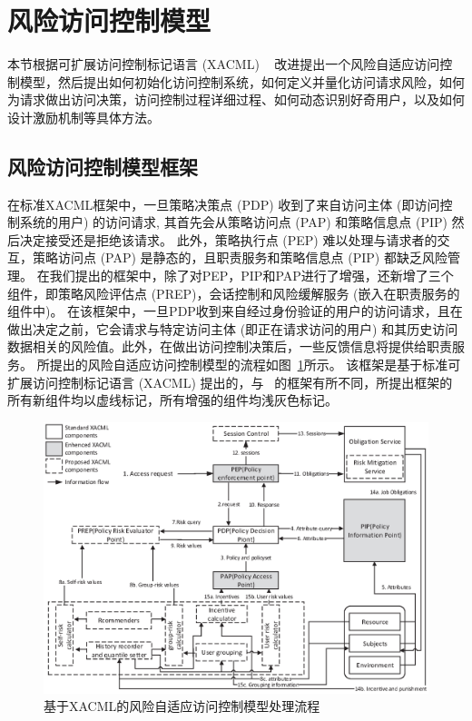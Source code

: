 \section{风险访问控制模型}
\label{sec:proposed model}
本节根据可扩展访问控制标记语言 (XACML) ~\cite{verma2004xml} 改进提出一个风险自适应访问控制模型，然后提出如何初始化访问控制系统，如何定义并量化访问请求风险，如何为请求做出访问决策，访问控制过程详细过程、如何动态识别好奇用户，以及如何设计激励机制等具体方法。

\subsection{风险访问控制模型框架}
\label{subsec:framework}

在标准XACML框架中，一旦策略决策点 (PDP) 收到了来自访问主体 (即访问控制系统的用户) 的访问请求, 其首先会从策略访问点 (PAP) 和策略信息点 (PIP) 然后决定接受还是拒绝该请求。 此外，策略执行点 (PEP) 难以处理与请求者的交互，策略访问点 (PAP) 是静态的，且职责服务和策略信息点 (PIP) 都缺乏风险管理。
在我们提出的框架中，除了对PEP，PIP和PAP进行了增强，还新增了三个组件，即策略风险评估点 (PREP)，会话控制和风险缓解服务 (嵌入在职责服务的组件中)。 在该框架中，一旦PDP收到来自经过身份验证的用户的访问请求，且在做出决定之前，它会请求与特定访问主体 (即正在请求访问的用户) 和其历史访问数据相关的风险值。此外，在做出访问控制决策后，一些反馈信息将提供给职责服务。 所提出的风险自适应访问控制模型的流程如图~\ref{fig:Process_flow}所示。 该框架是基于标准可扩展访问控制标记语言 (XACML) 提出的，与 ~\cite{shaikh2012dynamic}的框架有所不同，所提出框架的所有新组件均以虚线标记，所有增强的组件均浅灰色标记。


\begin{figure}[htbp]
	\includegraphics[width=\linewidth]{./figures/Process_flow.eps}
	\caption{基于XACML的风险自适应访问控制模型处理流程}
	\label{fig:Process_flow}
\end{figure}

